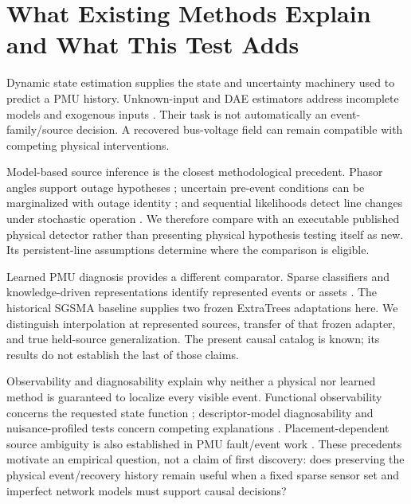 \section{What Existing Methods Explain and What This Test Adds}
\label{sec:narrative-related}

Dynamic state estimation supplies the state and uncertainty machinery used to predict a PMU history. Unknown-input and DAE estimators address incomplete models and exogenous inputs \cite{gillijns2007input,nugroho2022dae,katanic2024recursive}. Their task is not automatically an event-family/source decision. A recovered bus-voltage field can remain compatible with competing physical interventions.

Model-based source inference is the closest methodological precedent. Phasor angles support outage hypotheses \cite{tate2008outage}; uncertain pre-event conditions can be marginalized with outage identity \cite{zhao2014outages}; and sequential likelihoods detect line changes under stochastic operation \cite{chen2016quickest,rovatsos2017outage}. We therefore compare with an executable published physical detector rather than presenting physical hypothesis testing itself as new. Its persistent-line assumptions determine where the comparison is eligible.

Learned PMU diagnosis provides a different comparator. Sparse classifiers and knowledge-driven representations identify represented events or assets \cite{pandey2020realtime,li2024knowledge,yildiz2024few}. The historical SGSMA baseline supplies two frozen ExtraTrees adaptations here. We distinguish interpolation at represented sources, transfer of that frozen adapter, and true held-source generalization. The present causal catalog is known; its results do not establish the last of those claims.

Observability and diagnosability explain why neither a physical nor learned method is guaranteed to localize every visible event. Functional observability concerns the requested state function \cite{fernando2010functional,montanari2022functional}; descriptor-model diagnosability and nuisance-profiled tests concern competing explanations \cite{eriksson2013diagnosability,scharf1994matched}. Placement-dependent source ambiguity is also established in PMU fault/event work \cite{jamei2020limits,conte2023fault,yildiz2025sparse}. These precedents motivate an empirical question, not a claim of first discovery: does preserving the physical event/recovery history remain useful when a fixed sparse sensor set and imperfect network models must support causal decisions?

